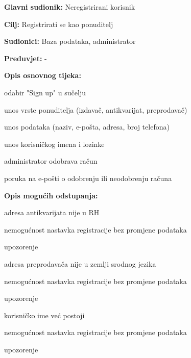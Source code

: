 					\noindent {}
					\begin{packed_item}
						\item \textbf{Glavni sudionik: }Neregistrirani korisnik
						\item  \textbf{Cilj:} Registrirati se kao ponuditelj
						\item  \textbf{Sudionici:} Baza podataka, administrator
						\item  \textbf{Preduvjet:} -
						\item  \textbf{Opis osnovnog tijeka:}
						\item[] \begin{packed_enum}
							\item odabir "Sign up" u sučelju
							\item unos vrste ponuditelja (izdavač, antikvarijat, preprodavač)
							\item unos podataka (naziv, e-pošta, adresa, broj telefona)
							\item unos korisničkog imena i lozinke
							\item administrator odobrava račun
							\item poruka na e-pošti o odobrenju ili neodobrenju računa
						\end{packed_enum}
						\item  \textbf{Opis mogućih odstupanja:}
						\item[] \begin{packed_item}
							\item[3.a] adresa antikvarijata nije u RH
							\item[] \begin{packed_enum}
								\item nemogućnost nastavka registracije bez promjene podataka
								\item upozorenje
							\end{packed_enum}
							\item[3.b] adresa preprodavača nije u zemlji srodnog jezika
							\item[] \begin{packed_enum}
								\item nemogućnost nastavka registracije bez promjene podataka
								\item upozorenje
							\end{packed_enum}
							\item[4.a] korisničko ime već postoji
							\item[] \begin{packed_enum}
								\item nemogućnost nastavka registracije bez promjene podataka
								\item upozorenje
							\end{packed_enum}	
						\end{packed_item}
					\end{packed_item}
					
